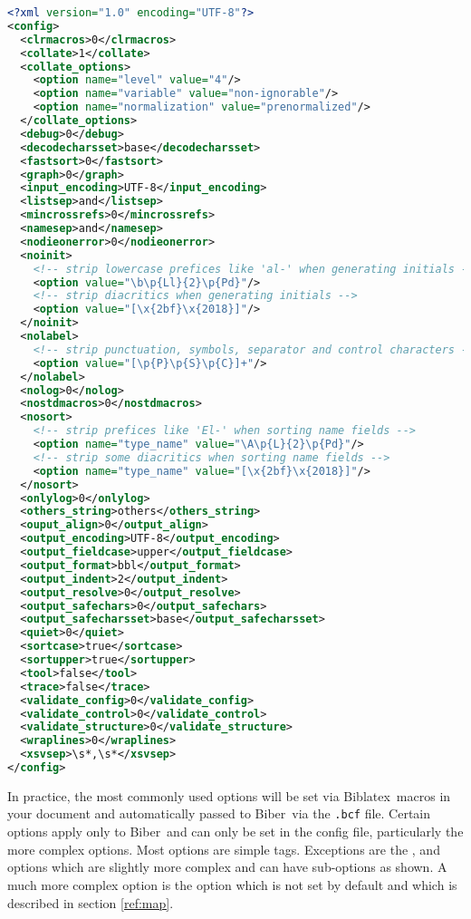 \documentclass{ltxdockit}
\newcommand*{\biber}{Biber\xspace}
\newcommand*{\biblatex}{Biblatex\xspace}
\begin{document}
\begin{lstlisting}[language=xml]
<?xml version="1.0" encoding="UTF-8"?>
<config>
  <clrmacros>0</clrmacros>
  <collate>1</collate>
  <collate_options>
    <option name="level" value="4"/>
    <option name="variable" value="non-ignorable"/>
    <option name="normalization" value="prenormalized"/>
  </collate_options>
  <debug>0</debug>
  <decodecharsset>base</decodecharsset>
  <fastsort>0</fastsort>
  <graph>0</graph>
  <input_encoding>UTF-8</input_encoding>
  <listsep>and</listsep>
  <mincrossrefs>0</mincrossrefs>
  <namesep>and</namesep>
  <nodieonerror>0</nodieonerror>
  <noinit>
    <!-- strip lowercase prefices like 'al-' when generating initials -->
    <option value="\b\p{Ll}{2}\p{Pd}"/>
    <!-- strip diacritics when generating initials -->
    <option value="[\x{2bf}\x{2018}]"/>
  </noinit>
  <nolabel>
    <!-- strip punctuation, symbols, separator and control characters -->
    <option value="[\p{P}\p{S}\p{C}]+"/> 
  </nolabel>
  <nolog>0</nolog>
  <nostdmacros>0</nostdmacros>
  <nosort>
    <!-- strip prefices like 'El-' when sorting name fields -->
    <option name="type_name" value="\A\p{L}{2}\p{Pd}"/>
    <!-- strip some diacritics when sorting name fields -->
    <option name="type_name" value="[\x{2bf}\x{2018}]"/>
  </nosort>
  <onlylog>0</onlylog>
  <others_string>others</others_string>
  <ouput_align>0</output_align>
  <output_encoding>UTF-8</output_encoding>
  <output_fieldcase>upper</output_fieldcase>
  <output_format>bbl</output_format>
  <output_indent>2</output_indent>
  <output_resolve>0</output_resolve>
  <output_safechars>0</output_safechars>
  <output_safecharsset>base</output_safecharsset>
  <quiet>0</quiet>
  <sortcase>true</sortcase>
  <sortupper>true</sortupper>
  <tool>false</tool>
  <trace>false</trace>
  <validate_config>0</validate_config>
  <validate_control>0</validate_control>
  <validate_structure>0</validate_structure>
  <wraplines>0</wraplines>
  <xsvsep>\s*,\s*</xsvsep>
</config>
\end{lstlisting}

\noindent In practice, the most commonly used options will be set via
\biblatex\ macros in your document and automatically passed to \biber\
via the \verb+.bcf+ file. Certain options apply only to \biber\ and can
only be set in the config file, particularly the more complex
options. Most options are simple tags. Exceptions are the
,  and  options which are slightly
more complex and can have sub-options as shown. A much more complex
option is the \opt{sourcemap} option which is not set by default and
which is described in section \ref{ref:map}.
\end{document}
